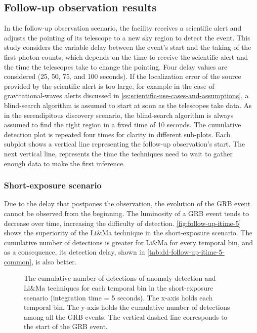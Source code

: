 \subsection{Follow-up observation results}
\label{s:Follow-Up-Observation-Results}
In the follow-up observation scenario, the facility receives a scientific alert and adjusts the pointing of its telescope to a new sky region to detect the event. This study considers the variable delay between the event's start and the taking of the first photon counts, which depends on the time to receive the scientific alert and the time the telescopes take to change the pointing. Four delay values are considered (25, 50, 75, and 100 seconds). If the localization error of the source provided by the scientific alert is too large, for example in the case of gravitational-waves alerts discussed in \autoref{ss:scientific-use-cases-and-assumptions}, a blind-search algorithm is assumed to start at soon as the telescopes take data. As in the serendipitous discovery scenario, the blind-search algorithm is always assumed to find the right region in a fixed time of 10 seconds. The cumulative detection plot is repeated four times for clarity in different sub-plots. Each subplot shows a vertical line representing the follow-up observation's start. The next vertical line, represents the time the techniques need to wait to gather enough data to make the first inference. 

\FloatBarrier
\subsubsection{Short-exposure scenario}
\label{s:Follow-Up-Observation-Results-Short-Term}
Due to the delay that postpones the observation, the evolution of the GRB event cannot be observed from the beginning. The luminosity of a GRB event tends to decrease over time, increasing the difficulty of detection. \autoref{fig:follow-up-itime-5} shows the superiority of the Li\&Ma technique in the short-exposure scenario. The cumulative number of detections is greater for Li\&Ma for every temporal bin, and as a consequence, its detection delay, shown in \autoref{tab:dd-follow-up-itime-5-common}, is also better.


\begin{figure}[!ht]
\centering

\captionsetup{width=1\linewidth}
\caption{The cumulative number of detections of anomaly detection and Li\&Ma techniques for each temporal bin in the short-exposure scenario (integration time = 5 seconds). The x-axis holds each temporal bin. The y-axis holds the cumulative number of detections among all the GRB events. The vertical dashed line corresponds to the start of the GRB event.}
\label{fig:follow-up-itime-5}
\end{figure}


